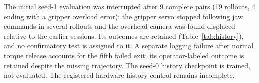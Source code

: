 The initial seed-1 evaluation was interrupted after 9 complete pairs (19 rollouts, 4 ending with a gripper overload error): the gripper servo stopped following jaw commands in several rollouts and the overhead camera was found displaced relative to the earlier sessions. Its outcomes are retained (Table~\ref{tab:history}), and no confirmatory test is assigned to it. A separate logging failure after normal torque release accounts for the fifth failed exit; its operator-labeled outcome is retained despite the missing trajectory. The seed-0 history checkpoint is trained, not evaluated. The registered hardware history control remains incomplete.
